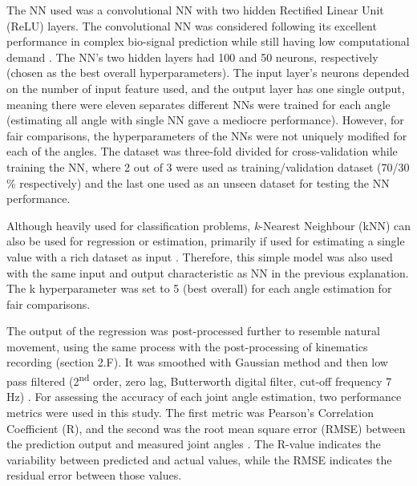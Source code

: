 \documentclass[conference]{IEEEtran}
\begin{document}
The NN used was a convolutional NN with two hidden Rectified Linear Unit (ReLU) layers. The
convolutional NN was considered following its excellent performance in complex bio-signal prediction while still having low computational demand \cite{b33}\cite{b34}. The NN’s two hidden layers had 100 and 50 neurons,
respectively (chosen as the best overall hyperparameters). The input layer’s neurons depended on the number 
of input feature used, and the output layer has one single output, meaning there were eleven separates
different NNs were trained for each angle (estimating all angle with single NN gave a mediocre
performance). However, for fair comparisons, the hyperparameters of the NNs were not uniquely modified 
for each of the angles. The dataset was three-fold divided for cross-validation while training the NN, where 
2 out of 3 were used as training/validation dataset (70/30 \% respectively) and the last one used as an unseen 
dataset for testing the NN performance.

Although heavily used for classification problems, \textit{k}-Nearest Neighbour (kNN) can also be used for 
regression or estimation, primarily if used for estimating a single value with a rich dataset as input \cite{b35}. 
Therefore, this simple model was also used with the same input and output characteristic as NN in the 
previous explanation. The k hyperparameter was set to 5 (best overall) for each angle estimation for fair 
comparisons.

The output of the regression was post-processed further to resemble natural movement, using the same 
process with the post-processing of kinematics recording (section 2.F). It was smoothed with Gaussian 
method and then low pass filtered (2\textsuperscript{nd} order, zero lag, Butterworth digital filter, cut-off frequency 7 Hz) 
\cite{b9}\cite{b16}.
For assessing the accuracy of each joint angle estimation, two performance metrics were used in this 
study. The first metric was Pearson’s Correlation Coefficient (R), and the second was the root mean square 
error (RMSE) between the prediction output and measured joint angles \cite{b16}. The R-value indicates the 
variability between predicted and actual values, while the RMSE indicates the residual error between those 
values.
\end{document}

